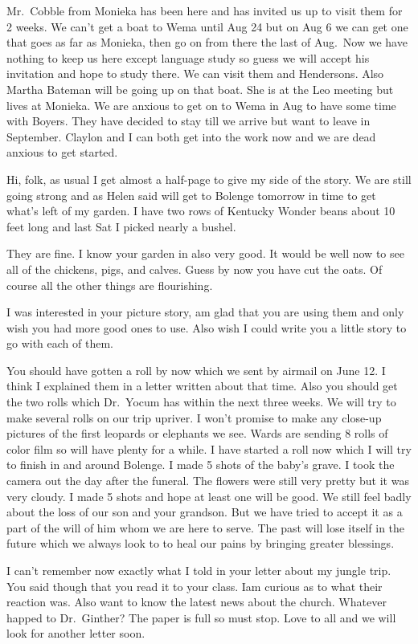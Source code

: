 \documentclass[
]{book}
\begin{document}
Mr.~Cobble from Monieka has been here and has invited us up to visit them for 2 weeks. We can't get a boat to Wema until Aug 24 but on Aug 6 we can get one that goes as far as Monieka, then go on from there the last of Aug.~Now we have nothing to keep us here except language study so guess we will accept his invitation and hope to study there. We can visit them and Hendersons. Also Martha Bateman will be going up on that boat. She is at the Leo meeting but lives at Monieka. We are anxious to get on to Wema in Aug to have some time with Boyers. They have decided to stay till we arrive but want to leave in September. Claylon and I can both get into the work now and we are dead anxious to get started.

Hi, folk, as usual I get almost a half-page to give my side of the story. We are still going strong and as Helen said will get to Bolenge tomorrow in time to get what's left of my garden. I have two rows of Kentucky Wonder beans about 10 feet long and last Sat I picked nearly a bushel.

They are fine. I know your garden in also very good. It would be well now to see all of the chickens, pigs, and calves. Guess by now you have cut the oats. Of course all the other things are flourishing.

I was interested in your picture story, am glad that you are using them and only wish you had more good ones to use. Also wish I could write you a little story to go with each of them.

You should have gotten a roll by now which we sent by airmail on June 12. I think I explained them in a letter written about that time. Also you should get the two rolls which Dr.~Yocum has within the next three weeks. We will try to make several rolls on our trip upriver. I won't promise to make any close-up pictures of the first leopards or elephants we see. Wards are sending 8 rolls of color film so will have plenty for a while. I have started a roll now which I will try to finish in and around Bolenge. I made 5 shots of the baby's grave. I took the camera out the day after the funeral. The flowers were still very pretty but it was very cloudy. I made 5 shots and hope at least one will be good. We still feel badly about the loss of our son and your grandson. But we have tried to accept it as a part of the will of him whom we are here to serve. The past will lose itself in the future which we always look to to heal our pains by bringing greater blessings.

I can't remember now exactly what I told in your letter about my jungle trip. You said though that you read it to your class. Iam curious as to what their reaction was. Also want to know the latest news about the church. Whatever happed to Dr.~Ginther? The paper is full so must stop. Love to all and we will look for another letter soon.
\end{document}
